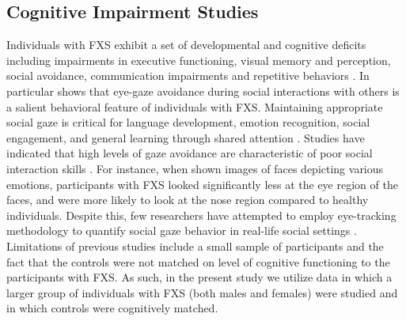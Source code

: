 \documentclass[10pt,twocolumn,letterpaper]{article}
\begin{document}
\subsection{Cognitive Impairment Studies} Individuals with FXS exhibit a set of developmental and cognitive deficits including impairments in executive functioning, visual memory and perception, social avoidance, communication impairments and repetitive behaviors \cite{Hall:2006jd,Pimentel:1999vx,Sullivan:2007gz,Sullivan:2006jc}. In particular \cite{Hall:2012ge} shows that eye-gaze avoidance during social interactions with others is a salient behavioral feature of individuals with FXS. Maintaining appropriate social gaze is critical for language development, emotion recognition, social engagement, and general learning through shared attention \cite{Csibra:2006wf, Morales:2000br,Emery:2000ug}. Studies have indicated that high levels of gaze avoidance are characteristic of poor social interaction skills \cite{DohertySneddon:2013fv,Riby:2012il}. For instance, when shown images of faces depicting various emotions, participants with FXS looked significantly less at the eye region of the faces, and were more likely to look at the nose region compared to healthy individuals. Despite this, few researchers have attempted to employ eye-tracking methodology to quantify social gaze behavior in real-life social settings \cite{Farzin:2009fq, Farzin:2011ip}.   Limitations of previous studies include a small sample of participants and the fact that the controls were not matched on level of cognitive functioning to the participants with FXS. As such, in the present study we utilize data in which a larger group of individuals with FXS (both males and females) were studied and in which controls were cognitively matched.
\end{document}
